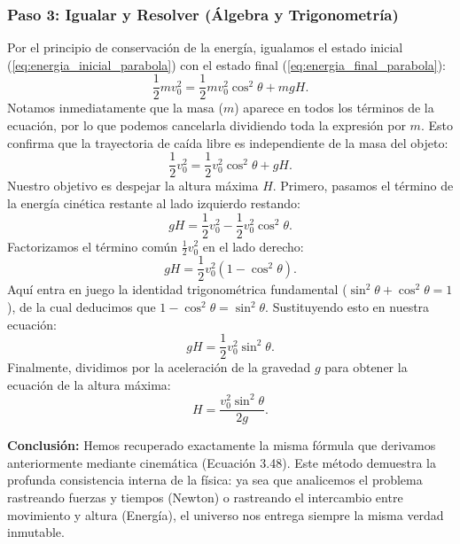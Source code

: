 \documentclass[11pt,a4paper]{book}
\begin{document}
\subsubsection*{Paso 3: Igualar y Resolver (Álgebra y Trigonometría)}
Por el principio de conservación de la energía, igualamos el estado inicial (\ref{eq:energia_inicial_parabola}) con el estado final (\ref{eq:energia_final_parabola}):
\begin{equation}
    \frac{1}{2} m v_0^2 = \frac{1}{2} m v_0^2 \cos^2\theta + mgH.
\end{equation}
Notamos inmediatamente que la masa ($m$) aparece en todos los términos de la ecuación, por lo que podemos cancelarla dividiendo toda la expresión por $m$. Esto confirma que la trayectoria de caída libre es independiente de la masa del objeto:
\begin{equation}
    \frac{1}{2} v_0^2 = \frac{1}{2} v_0^2 \cos^2\theta + gH.
\end{equation}
Nuestro objetivo es despejar la altura máxima $H$. Primero, pasamos el término de la energía cinética restante al lado izquierdo restando:
\begin{equation}
    gH = \frac{1}{2} v_0^2 - \frac{1}{2} v_0^2 \cos^2\theta.
\end{equation}
Factorizamos el término común $\frac{1}{2} v_0^2$ en el lado derecho:
\begin{equation}
    gH = \frac{1}{2} v_0^2 \left( 1 - \cos^2\theta \right).
\end{equation}
Aquí entra en juego la identidad trigonométrica fundamental ($\sin^2\theta + \cos^2\theta = 1$), de la cual deducimos que $1 - \cos^2\theta = \sin^2\theta$. Sustituyendo esto en nuestra ecuación:
\begin{equation}
    gH = \frac{1}{2} v_0^2 \sin^2\theta.
\end{equation}
Finalmente, dividimos por la aceleración de la gravedad $g$ para obtener la ecuación de la altura máxima:
\begin{equation}
    H = \frac{v_0^2 \sin^2\theta}{2g}.
\end{equation}

\textbf{Conclusión:} 
Hemos recuperado exactamente la misma fórmula que derivamos anteriormente mediante cinemática (Ecuación 3.48). Este método demuestra la profunda consistencia interna de la física: ya sea que analicemos el problema rastreando fuerzas y tiempos (Newton) o rastreando el intercambio entre movimiento y altura (Energía), el universo nos entrega siempre la misma verdad inmutable.
\end{document}
